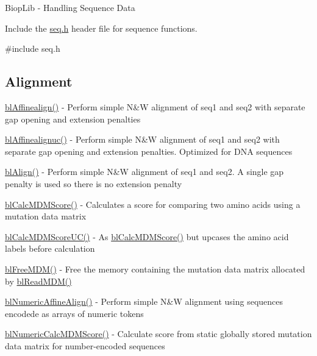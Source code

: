 Biop\-Lib -\/ Handling Sequence Data

Include the \hyperlink{seq_8h}{seq.\-h} header file for sequence functions.


\begin{DoxyCode}
\textcolor{preprocessor}{#include seq.h}
\end{DoxyCode}


\subsection*{Alignment }


\begin{DoxyItemize}
\item \hyperlink{align_8c_a2bfda833cbb45aa99d853f90b0a8c3e6}{bl\-Affinealign()} -\/ Perform simple N\&W alignment of seq1 and seq2 with separate gap opening and extension penalties
\item \hyperlink{align_8c_a202550fea7f22fad1fa8bcd23aa736b3}{bl\-Affinealignuc()} -\/ Perform simple N\&W alignment of seq1 and seq2 with separate gap opening and extension penalties. Optimized for D\-N\-A sequences
\item \hyperlink{align_8c_ad4440404ba000b804b8e5bdbf5144296}{bl\-Align()} -\/ Perform simple N\&W alignment of seq1 and seq2. A single gap penalty is used so there is no extension penalty
\item \hyperlink{align_8c_a503439e6489823462c1c4c242ccc47e0}{bl\-Calc\-M\-D\-M\-Score()} -\/ Calculates a score for comparing two amino acids using a mutation data matrix
\item \hyperlink{align_8c_ad4bd60d9e34a3ac0d408508be92f4c83}{bl\-Calc\-M\-D\-M\-Score\-U\-C()} -\/ As \hyperlink{align_8c_a503439e6489823462c1c4c242ccc47e0}{bl\-Calc\-M\-D\-M\-Score()} but upcases the amino acid labels before calculation
\item \hyperlink{align_8c_a6ff80e0085ce2af58bdbdfbefa887749}{bl\-Free\-M\-D\-M()} -\/ Free the memory containing the mutation data matrix allocated by \hyperlink{align_8c_a7427990ccc2bc14bf3e1a1797a1aaba7}{bl\-Read\-M\-D\-M()}
\item \hyperlink{_numeric_align_8c_a65436ca35c20f5c0dca48c3ead12b816}{bl\-Numeric\-Affine\-Align()} -\/ Perform simple N\&W alignment using sequences encodede as arrays of numeric tokens
\item \hyperlink{_numeric_align_8c_a4ca4dc7d7e7714971036f5d1e22ccce6}{bl\-Numeric\-Calc\-M\-D\-M\-Score()} -\/ Calculate score from static globally stored mutation data matrix for number-\/encoded sequences

\end{DoxyItemize}
